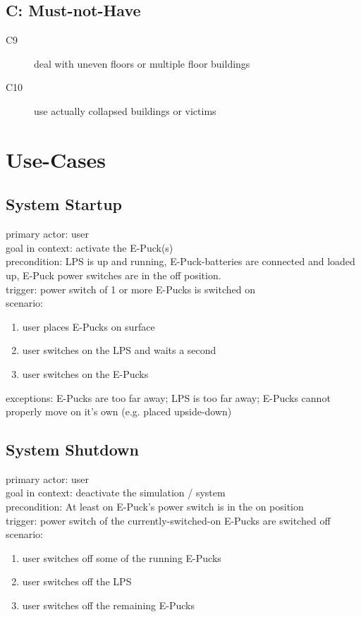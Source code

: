 \documentclass[a4paper,parskip,headheight=38pt]{scrartcl} %
\begin{document}
\subsection*{C: Must-not-Have}
\begin{description}
\item[C9] deal with uneven floors or multiple floor buildings
\item[C10] use actually collapsed buildings or victims
\end{description}


\section{Use-Cases}
\subsection{System Startup}
primary actor: user \\
goal in context: activate the E-Puck(s) \\
precondition: LPS is up and running, E-Puck-batteries are connected and loaded up, E-Puck power switches are in the off position. \\
trigger: power switch of 1 or more E-Pucks is switched on \\
scenario: 
\begin{enumerate}[1.]
	\item user places E-Pucks on surface 
	\item user switches on the LPS and waits a second 
	\item user switches on the E-Pucks 
\end{enumerate}
exceptions: E-Pucks are too far away; LPS is too far away; E-Pucks cannot properly move on it's own (e.g. placed upside-down) \\

\subsection{System Shutdown}
primary actor: user \\
goal in context: deactivate the simulation / system \\
precondition: At least on E-Puck's power switch is in the on position \\
trigger: power switch of the currently-switched-on E-Pucks are switched off \\
scenario: 
\begin{enumerate}[1.]
	\item user switches off some of the running E-Pucks 
	\item user switches off the LPS 
	\item user switches off the remaining E-Pucks 
\end{enumerate}
\end{document}
